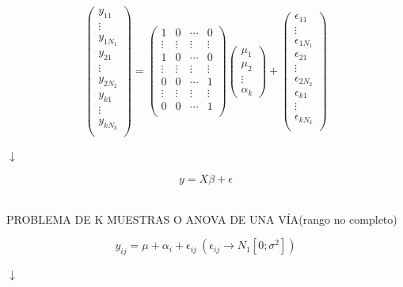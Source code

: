 \documentclass[10pt,a4paper]{book}
\begin{document}
$$ \left( \begin{array}{c}
y_{11}\\
\vdots\\
y_{1N_1}\\
\hline
y_{21}\\
\vdots\\
y_{2N_2}\\
\hline
y_{k1}\\
\vdots\\
y_{kN_k}\\
\end{array} \right) =  
\left( \begin{array}{cccc}
1 & 0 & \cdots & 0\\
\vdots & \vdots & \vdots & \vdots\\
1 & 0 & \cdots & 0\\
\hline
\vdots & \vdots & \vdots & \vdots\\
\hline
0 & 0 & \cdots & 1\\
\vdots & \vdots & \vdots & \vdots\\
0 & 0 & \cdots & 1\\
\end{array} \right)
\left( \begin{array}{c}
\mu_1\\
\mu_2\\
\vdots\\
\alpha_k \end{array} \right) + 
\left( \begin{array}{c}
\epsilon_{11}\\
\vdots\\
\epsilon_{1N_1}\\
\hline
\epsilon_{21}\\
\vdots\\
\epsilon_{2N_2}\\
\hline
\epsilon_{k1}\\
\vdots\\
\epsilon_{kN_k}\\
\end{array} \right)$$
\begin{center}
$ \downarrow $
\end{center}
$$y=X\beta+\epsilon$$
\ \\
\begin{center}
PROBLEMA DE K MUESTRAS O ANOVA DE UNA VÍA(rango no completo)
\end{center}
$$y_{ij}=\mu + \alpha_i + \epsilon_{ij}\ (\epsilon_{ij} \rightarrow N_1[0;\sigma^2])$$
\begin{center}
$ \downarrow $
\end{center}
\end{document}
